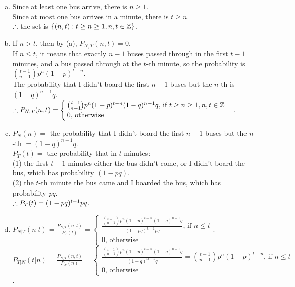\begin{pr}$ $
\begin{enumerate}[(a)]
\item Since at least one bus arrive, there is $n\geq1$.\\
Since at most one bus arrives in a minute, there is $t\geq n$.\\
$\therefore$ the set is $\{(n, t):t\geq n\geq1, n, t\in\mathbb{Z}\}$.
\item If $n>t$, then by (a), $P_{N, T}(n, t)=0$.\\
If $n\leq t$, it means that exactly $n-1$ buses passed through in the first $t-1$ minutes, and a bus passed through at the $t$-th minute, so the probability is $\binom{t-1}{n-1}p^n(1-p)^{t-n}$.\\
The probability that I didn't board the first $n-1$ buses but the $n$-th is $(1-q)^{n-1}q$.\\
$\therefore P_{N, T}(n, t)=\begin{cases}
\binom{t-1}{n-1}p^n(1-p)^{t-n}(1-q)^{n-1}q\text{, if }t\geq n\geq1, n, t\in\mathbb{Z}\\
0\text{, otherwise}
\end{cases}$.
\item $P_N(n)=$ the probability that I didn't board the first $n-1$ buses but the $n$-th $=(1-q)^{n-1}q$.\\
$P_T(t)=$ the probability that in $t$ minutes:\\
(1) the first $t-1$ minutes either the bus didn't come, or I didn't board the bus, which has probability $(1-pq)$.\\
(2) the $t$-th minute the bus came and I boarded the bus, which has probability $pq$.\\
$\therefore P_T(t)=(1-pq)^{t-1}pq$.
\item $P_{N|T}(n|t)=\frac{P_{N, T}(n, t)}{P_T(t)}=\begin{cases}
\frac{\binom{t-1}{n-1}p^n(1-p)^{t-n}(1-q)^{n-1}q}{(1-pq)^{t-1}pq}\text{, if }n\leq t\\
0\text{, otherwise}
\end{cases}$.\\
$P_{T|N}(t|n)=\frac{P_{N, T}(n, t)}{P_N(n)}=\begin{cases}
\frac{\binom{t-1}{n-1}p^n(1-p)^{t-n}(1-q)^{n-1}q}{(1-q)^{n-1}q}=\binom{t-1}{n-1}p^n(1-p)^{t-n}\text{, if }n\leq t\\
0\text{, otherwise}
\end{cases}$.
\end{enumerate}
\end{pr}
